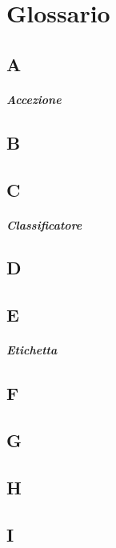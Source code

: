 \chapter{Glossario}
\section*{A}
\paragraph*{Accezione}
\section*{B}
\section*{C}
\paragraph*{Classificatore}
\section*{D}
\section*{E}
\paragraph*{Etichetta}
\section*{F}
\section*{G}
\section*{H}
\section*{I}
